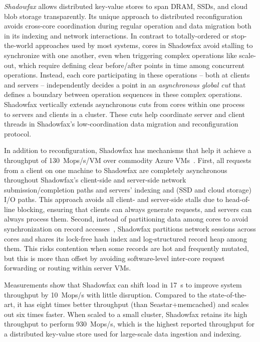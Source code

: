 \emph{Shadowfax} allows distributed key-value stores to
span DRAM, SSDs, and cloud blob storage transparently.
%
Its unique approach to
distributed reconfiguration avoids cross-core coordination during
regular operation and data migration both in its indexing and network
interactions.
%
In contrast to totally-ordered or stop-the-world approaches used by most
systems, cores in Shadowfax avoid stalling to synchronize with one another, even when
triggering complex operations like scale-out, which require
defining clear before/after points in time among concurrent operations.
%
Instead, each core participating in these operations -- both at clients and
servers -- independently decides a point in an \emph{asynchronous global
cut} that defines a boundary between operation sequences in these complex operations.
%
Shadowfax vertically extends asynchronous cuts from cores within one
process~\cite{faster} to servers
and clients in a cluster.
%
These cuts help coordinate server
and client threads
in Shadowfax's low-coordination data migration and
reconfiguration protocol.

In addition to reconfiguration, Shadowfax has mechanisms that help it
achieve a throughput of 130~Mops/s/VM over
commodity Azure VMs~\cite{azure}.
%
First, all requests from a client on one machine to Shadowfax are
completely asynchronous throughout Shadowfax's client-side and
server-side network submission/completion paths and servers' indexing and
(SSD and cloud storage) I/O paths.
%
This approach avoids all client- and server-side stalls due to head-of-line
blocking, ensuring that clients can always generate
requests, and
servers can always process them.
%
Second, instead of partitioning data among cores to avoid synchronization on record
accesses~\cite{hstore,voltdb,mica,seastar}, Shadowfax partitions network
sessions across cores and shares its lock-free hash index and log-structured
record heap among them.
%
This risks contention when some records are hot and frequently
mutated, but this is more than offset by avoiding software-level
inter-core request forwarding or routing within server VMs.

Measurements show that Shadowfax can shift load in 17~s to improve system throughput by
10~Mops/s
with little disruption. Compared to the state-of-the-art, it has eight
times better throughput
  (than Seastar+memcached) and scales out six times faster.
%
When scaled to a small cluster, Shadowfax retains its high throughput to
perform 930~Mops/s,
%
which is the highest
reported throughput for a distributed key-value store used for
large-scale data ingestion and indexing.

